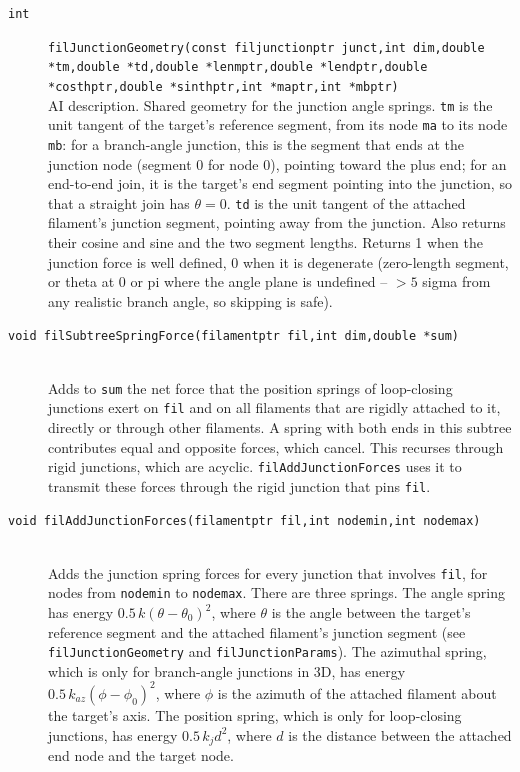 \documentclass {scrbook}
\newcommand {\ttt} {\texttt}
\begin{document}
\begin{description}
\item[\ttt{int }] %
\ttt{filJunctionGeometry(const filjunctionptr junct,int dim,double *tm,double *td,double *lenmptr,double *lendptr,double *costhptr,double *sinthptr,int *maptr,int *mbptr)}
\hfill \\
AI description. Shared geometry for the junction angle springs. \ttt{tm} is the unit tangent of the target's reference segment, from its node \ttt{ma} to its node \ttt{mb}: for a branch-angle junction, this is the segment that ends at the junction node (segment 0 for node 0), pointing toward the plus end; for an end-to-end join, it is the target's end segment pointing into the junction, so that a straight join has $\theta=0$. \ttt{td} is the unit tangent of the attached filament's junction segment, pointing away from the junction. Also returns their cosine and sine and the two segment lengths. Returns 1 when the junction force is well defined, 0 when it is degenerate (zero-length segment, or theta at 0 or pi where the angle plane is undefined -- $>5$ sigma from any realistic branch angle, so skipping is safe).

\item[\ttt{void filSubtreeSpringForce(filamentptr fil,int dim,double *sum)}] %
\hfill \\
Adds to \ttt{sum} the net force that the position springs of loop-closing junctions exert on \ttt{fil} and on all filaments that are rigidly attached to it, directly or through other filaments. A spring with both ends in this subtree contributes equal and opposite forces, which cancel. This recurses through rigid junctions, which are acyclic. \ttt{filAddJunctionForces} uses it to transmit these forces through the rigid junction that pins \ttt{fil}.

\item[\ttt{void filAddJunctionForces(filamentptr fil,int nodemin,int nodemax)}] %
\hfill \\
Adds the junction spring forces for every junction that involves \ttt{fil}, for nodes from \ttt{nodemin} to \ttt{nodemax}. There are three springs. The angle spring has energy $0.5\,k(\theta-\theta_0)^2$, where $\theta$ is the angle between the target's reference segment and the attached filament's junction segment (see \ttt{filJunctionGeometry} and \ttt{filJunctionParams}). The azimuthal spring, which is only for branch-angle junctions in 3D, has energy $0.5\,k_{az}(\phi-\phi_0)^2$, where $\phi$ is the azimuth of the attached filament about the target's axis. The position spring, which is only for loop-closing junctions, has energy $0.5\,k_j d^2$, where $d$ is the distance between the attached end node and the target node.


\end{description}
\end{document}
